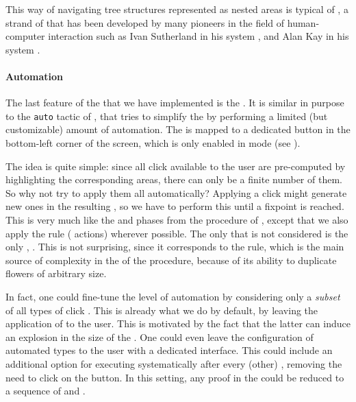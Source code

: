 \begin{scope}
\begin{remark}
\AP This way of navigating tree structures represented as nested areas is typical of
, a strand of  that has been developed by
many pioneers in the field of human-computer interaction such as Ivan Sutherland
in his  system , and Alan Kay
in his  system .
\end{remark}

\paragraph{Automation}

\AP
The last feature of the  that we have implemented is the
  . It is similar in purpose to the \texttt{auto}
tactic of , that tries to simplify the  by performing a limited
(but customizable) amount of automation. The   is mapped to a
dedicated button in the bottom-left corner of the screen, which is only enabled
in  mode (see ).

The idea is quite simple: since all click  available to the user are
pre-computed by highlighting the corresponding areas, there can only be a finite
number of them. So why not try to apply them all automatically? Applying a click
 might generate new ones in the resulting , so we have to perform
this until a fixpoint is reached. This is very much like the  and  phases from the
 procedure of , except that we also apply
the  rule ( actions) wherever possible. The only
  that is not considered is the only  ,
. This is not surprising, since it corresponds to the 
rule, which is the main source of complexity in the  of
the  procedure, because of its ability to duplicate flowers of
arbitrary size.

In fact, one could fine-tune the level of automation by considering only a
\emph{subset} of all types of click . This is already what we do by
default, by leaving the application of   to the user. This is
motivated by the fact that the latter can induce an explosion in the size of the
. One could even leave the configuration of automated  types to
the user with a dedicated interface. This could include an additional option for
executing  systematically after every (other)  ,
removing the need to click on the  button. In this setting, any proof
in the  could be reduced to a sequence of  and
 .



\end{scope}
